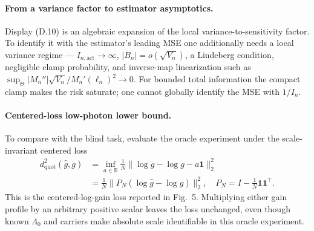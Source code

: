 \paragraph{From a variance factor to estimator asymptotics.} Display (D.10) is an algebraic expansion of the local variance-to-sensitivity factor. To identify it with the estimator's leading MSE one additionally needs a local variance regime --- $I_{n,\mathrm{act}}\to\infty$, $|B_n|=o(\sqrt{V_n})$, a Lindeberg condition, negligible clamp probability, and inverse-map linearization such as $\sup_{\Theta}|M_n''|\sqrt{V_n}/M_n'(\ell_n)^2\to0$. For bounded total information the compact clamp makes the risk saturate; one cannot globally identify the MSE with $1/I_n$.

\paragraph{Centered-loss low-photon lower bound.}
To compare with the blind task, evaluate the oracle experiment under the scale-invariant centered loss
\[
\begin{aligned}
d_{\mathrm{quot}}^2(\hat g,g)
&=\inf_{a\in\mathbb R}\frac1N\|\log\hat g-\log g-a\mathbf1\|_2^2\\
&=\frac1N\|P_N(\log\hat g-\log g)\|_2^2,
\quad
P_N=I-\tfrac1N\mathbf1\mathbf1^\top.
\end{aligned}
\]
This is the centered-log-gain loss reported in Fig.~5. Multiplying either gain profile by an arbitrary positive scalar leaves the loss unchanged, even though known $\Lambda_0$ and carriers make absolute scale identifiable in this oracle experiment.

